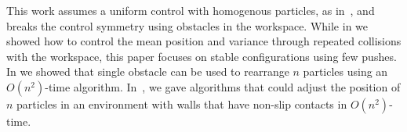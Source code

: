  This work assumes a uniform control with homogenous particles, as in~\cite{AaronManipulation2013,shahrokhiTRO2019}, and breaks the control symmetry using obstacles in the workspace. 
  While in \cite{shahrokhi2018TRO} we showed how to control the mean position and variance through repeated collisions with the workspace, this paper focuses on stable configurations using few pushes. 
   In \cite{AaronManipulation2013} we showed that single obstacle can be used to rearrange $n$ particles using an $O(n^2)$-time algorithm.
   In~\cite{shahrokhi2017}, we gave algorithms that could adjust the position of $n$ particles in an environment with walls that have non-slip contacts in $O(n^2)$-time. %
 


